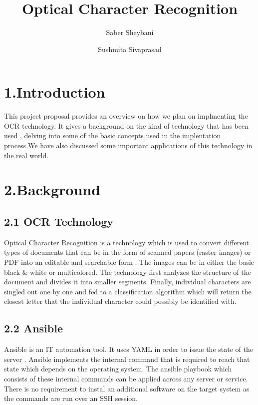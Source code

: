 \documentclass[9pt,twocolumn,twoside]{styles/osajnl}
\title{Optical Character Recognition}
\author[1]{Saber Sheybani}
\author[1]{Sushmita Sivaprasad}
\affil[1]{School of Informatics and Computing, Bloomington, IN 47408, U.S.A.}
\affil[*]{Corresponding authors: sheybani@umail.iu.edu,sushsiva@umail.iu.edu}
\begin{document}
\maketitle

\section{1.Introduction}

This project proposal provides an overview on how we plan on
implmenting the OCR technology. It gives a background on the kind of
technology that has been used , delving into some of the basic
concepts used in the implentation process.We have also discussed some
important applications of this technology in the real world.

\section{2.Background}
\subsection{2.1 OCR Technology}  
Optical Character Recognition is a technology which is used to convert
different types of documents that can be in the form of scanned papers
(raster images) or PDF into an editable and searchable form  \cite{www-ocr}. The
images can be in either the basic black \& white or multicolored.  The
technology first analyzes the structure of the document and divides it
into smaller segments. Finally, individual characters are singled out
one by one and fed to a classification algorithm which will return the
closest letter that the individual character could possibly be
identified with.

\subsection{2.2 Ansible} 
Ansible is an IT automation tool. It uses YAML in order to issue the
state of the server \cite{www-ocr}. Ansible implements the internal command that
is required to reach that state which depends on the operating
system. The ansible playbook which consists of these internal commands
can be applied across any server or service. There is no requirement
to instal an additional software on the target system as the commands
are run over an SSH session.
\end{document}
